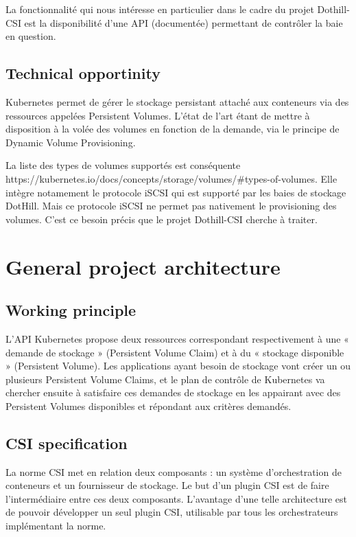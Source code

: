 La fonctionnalité qui nous intéresse en particulier dans le cadre du projet Dothill-CSI est la disponibilité d'une API (documentée) permettant de contrôler la baie en question.
\color{black}

\subsection{Technical opportinity}

\color{darkgreen}
Kubernetes permet de gérer le stockage persistant attaché aux conteneurs via des ressources appelées Persistent Volumes. L'état de l'art étant de mettre à disposition à la volée des volumes en fonction de la demande, via le principe de Dynamic Volume Provisioning.

La liste des types de volumes supportés est conséquente https://kubernetes.io/docs/concepts/storage/volumes/\#types-of-volumes. Elle intègre notamement le protocole iSCSI qui est supporté par les baies de stockage DotHill. Mais ce protocole iSCSI ne permet pas nativement le provisioning des volumes. C'est ce besoin précis que le projet Dothill-CSI cherche à traiter.
\color{black}

\section{General project architecture}

\subsection{Working principle}

\color{darkgreen}
L'API Kubernetes propose deux ressources correspondant respectivement à une « demande de stockage » (Persistent Volume Claim) et à du « stockage disponible » (Persistent Volume). Les applications ayant besoin de stockage vont créer un ou plusieurs Persistent Volume Claims, et le plan de contrôle de Kubernetes va chercher ensuite à satisfaire ces demandes de stockage en les appairant avec des Persistent Volumes disponibles et répondant aux critères demandés.
\color{black}

\subsection{CSI specification}

\color{darkgreen}
La norme CSI met en relation deux composants : un système d'orchestration de conteneurs et un fournisseur de stockage. Le but d'un plugin CSI est de faire l'intermédiaire entre ces deux composants. L'avantage d'une telle architecture est de pouvoir développer un seul plugin CSI, utilisable par tous les orchestrateurs implémentant la norme.

